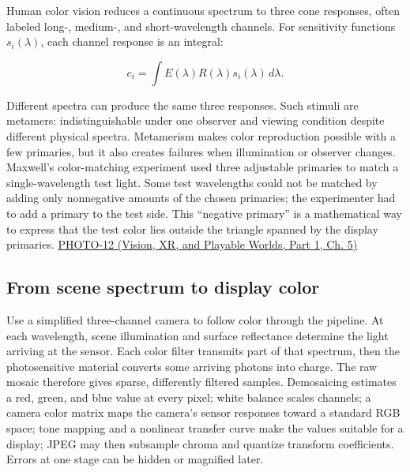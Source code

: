 Human color vision reduces a continuous spectrum to three cone responses, often labeled long-, medium-, and short-wavelength channels. For sensitivity functions \(s_i(\lambda)\), each channel response is an integral:

\[
c_i=\int E(\lambda)R(\lambda)s_i(\lambda)\,d\lambda.
\]

Different spectra can produce the same three responses. Such stimuli are metamers: indistinguishable under one observer and viewing condition despite different physical spectra. Metamerism makes color reproduction possible with a few primaries, but it also creates failures when illumination or observer changes. Maxwell's color-matching experiment used three adjustable primaries to match a single-wavelength test light. Some test wavelengths could not be matched by adding only nonnegative amounts of the chosen primaries; the experimenter had to add a primary to the test side. This ``negative primary'' is a mathematical way to express that the test color lies outside the triangle spanned by the display primaries. \href{../07-Vision-XR-and-Playable-Worlds-P01/main.pdf\#nameddest=04-visual-computing-ii-ch036-photo-12---photography-session-12}{PHOTO-12 (Vision, XR, and Playable Worlds, Part 1, Ch. 5)}

\subsection{From scene spectrum to display color}\label{03-visual-computing-i-ch004-from-scene-spectrum-to-display-color}

\hypertarget{03-visual-computing-i-ch004-from-scene-spectrum-to-display-color}{}

Use a simplified three-channel camera to follow color through the pipeline. At each wavelength, scene illumination and surface reflectance determine the light arriving at the sensor. Each color filter transmits part of that spectrum, then the photosensitive material converts some arriving photons into charge. The raw mosaic therefore gives sparse, differently filtered samples. Demosaicing estimates a red, green, and blue value at every pixel; white balance scales channels; a camera color matrix maps the camera's sensor responses toward a standard RGB space; tone mapping and a nonlinear transfer curve make the values suitable for a display; JPEG may then subsample chroma and quantize transform coefficients. Errors at one stage can be hidden or magnified later.

